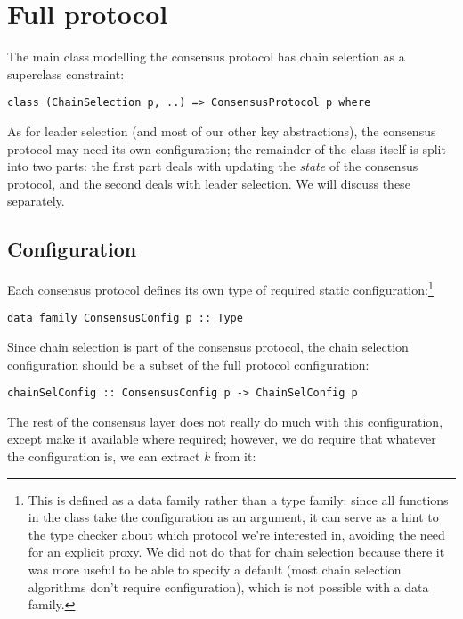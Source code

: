 \section{Full protocol}
\label{class:ConsensusProtocol}

The main class modelling the consensus protocol has chain selection as a
superclass constraint:

\begin{lstlisting}
class (ChainSelection p, ..) => ConsensusProtocol p where
\end{lstlisting}

As for leader selection (and most of our other key abstractions), the consensus
protocol may need its own configuration; the remainder of the class itself is
split into two parts: the first part deals with updating the \emph{state} of the
consensus protocol, and the second deals with leader selection. We will discuss
these separately.

\subsection{Configuration}
\label{class:ConsensusProtocol:config}

Each consensus protocol defines its own type of required static
configuration:\footnote{This is defined as a data family rather than a type
family: since all functions in the class take the configuration as an argument,
it can serve as a hint to the type checker about which protocol we're interested
in, avoiding the need for an explicit proxy. We did not do that for chain
selection because there it was more useful to be able to specify a default (most
chain selection algorithms don't require configuration), which is not possible
with a data family.}

\begin{lstlisting}
data family ConsensusConfig p :: Type
\end{lstlisting}

Since chain selection is part of the consensus protocol, the chain selection
configuration should be a subset of the full protocol configuration:

\begin{lstlisting}
chainSelConfig :: ConsensusConfig p -> ChainSelConfig p
\end{lstlisting}

The rest of the consensus layer does not really do much with this configuration,
except make it available where required; however, we do require that whatever
the configuration is, we can extract $k$ from it:

